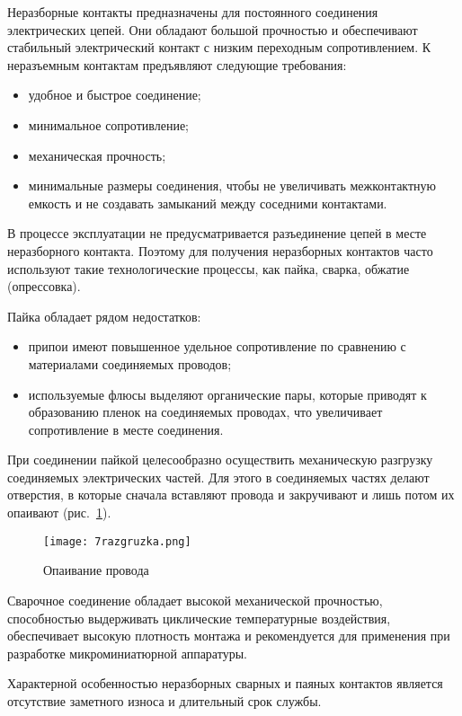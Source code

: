 Неразборные контакты предназначены для постоянного соединения электрических цепей. Они обладают большой прочностью и обеспечивают стабильный электрический контакт с низким переходным сопротивлением. К неразъемным контактам предъявляют следующие требования:
\begin{itemize}
\item удобное и быстрое соединение;
\item минимальное сопротивление;
\item механическая прочность;
\item минимальные размеры соединения, чтобы не увеличивать межконтактную емкость и не создавать замыканий между соседними контактами.
\end{itemize}

В процессе эксплуатации не предусматривается разъединение цепей в месте неразборного контакта. Поэтому для получения неразборных контактов часто используют такие технологические процессы, как пайка, сварка, обжатие (опрессовка). 

Пайка обладает рядом недостатков:
\begin{itemize}
\item припои имеют повышенное удельное сопротивление по сравнению с материалами соединяемых проводов;
\item используемые флюсы выделяют органические пары, которые приводят к образованию пленок на соединяемых проводах, что увеличивает сопротивление в месте соединения.
\end{itemize}

При соединении пайкой целесообразно осуществить механическую разгрузку соединяемых электрических частей. Для этого в соединяемых частях делают отверстия, в которые сначала вставляют провода и закручивают и лишь потом их опаивают (рис.~\ref{pic:7razgruzka}). 

\begin{figure}[h!]
	\caption{ Опаивание провода }
	\texttt{[image: 7razgruzka.png]}
	\label{pic:7razgruzka}
\end{figure}

Сварочное соединение обладает высокой механической прочностью, способностью выдерживать циклические температурные воздействия, обеспечивает высокую плотность монтажа и рекомендуется для применения при разработке микроминиатюрной аппаратуры.

Характерной особенностью неразборных сварных и паяных контактов является отсутствие заметного износа и длительный срок службы.

